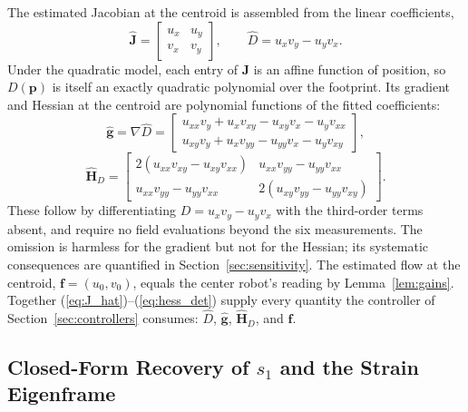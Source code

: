 \documentclass[lettersize,journal]{IEEEtran}
\begin{document}
The estimated Jacobian at the centroid is assembled from the linear
coefficients,
\begin{equation}
    \hat{\mathbf{J}} =
    \begin{bmatrix} u_x & u_y \\ v_x & v_y \end{bmatrix},
    \qquad
    \hat{D} = u_x v_y - u_y v_x.
    \label{eq:J_hat}
\end{equation}
Under the quadratic model, each entry of $\mathbf{J}$ is an affine
function of position, so $D(\mathbf{p})$ is itself an exactly quadratic
polynomial over the footprint. Its gradient and Hessian at the centroid
are polynomial functions of the fitted coefficients:
\begin{equation}
    \hat{\mathbf{g}} = \nabla \hat{D} =
    \begin{bmatrix}
        u_{xx} v_y + u_x v_{xy} - u_{xy} v_x - u_y v_{xx} \\
        u_{xy} v_y + u_x v_{yy} - u_{yy} v_x - u_y v_{xy}
    \end{bmatrix},
    \label{eq:grad_det}
\end{equation}
\begin{equation}
    \hat{\mathbf{H}}_D =
    \begin{bmatrix}
        2(u_{xx} v_{xy} - u_{xy} v_{xx}) &
        u_{xx} v_{yy} - u_{yy} v_{xx} \\
        u_{xx} v_{yy} - u_{yy} v_{xx} &
        2(u_{xy} v_{yy} - u_{yy} v_{xy})
    \end{bmatrix}.
    \label{eq:hess_det}
\end{equation}
These follow by differentiating $D = u_x v_y - u_y v_x$ with the
third-order terms absent, and require no field evaluations beyond the six
measurements. The omission is harmless for the gradient but not for the
Hessian; its systematic consequences are quantified in
Section~\ref{sec:sensitivity}. The estimated flow at the centroid,
$\mathbf{f} = (u_0, v_0)$, equals the center robot's reading by
Lemma~\ref{lem:gains}. Together
(\ref{eq:J_hat})--(\ref{eq:hess_det}) supply every quantity the
controller of Section~\ref{sec:controllers} consumes: $\hat{D}$,
$\hat{\mathbf{g}}$, $\hat{\mathbf{H}}_D$, and $\mathbf{f}$.

\subsection{Closed-Form Recovery of $s_1$ and the Strain Eigenframe}
\label{sec:s1_estimation}
\end{document}
